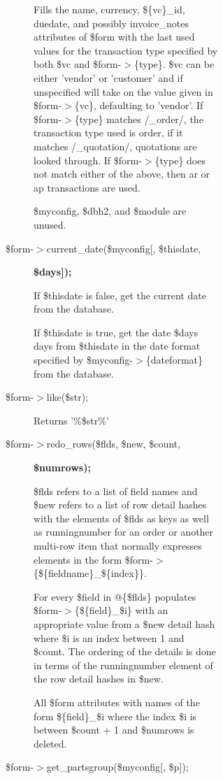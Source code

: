 \begin{description}
\begin{description}
\begin{description}
\begin{description}
\begin{description}
\begin{description}
Fills the name, currency, \$\{vc\}\_id, duedate, and possibly invoice\_notes
attributes of \$form with the last used values for the transaction type specified
by both \$vc and \$form-$>$\{type\}.  \$vc can be either 'vendor' or 'customer' and if
unspecified will take on the value given in \$form-$>$\{vc\}, defaulting to 'vendor'.
If \$form-$>$\{type\} matches /\_order/, the transaction type used is order, if it
matches /\_quotation/, quotations are looked through.  If \$form-$>$\{type\} does not
match either of the above, then ar or ap transactions are used.



\$myconfig, \$dbh2, and \$module are unused.


\item[{\$form-$>$current\_date(\$myconfig[, \$thisdate,}] \textbf{\$days]);}

If \$thisdate is false, get the current date from the database.



If \$thisdate is true, get the date \$days days from \$thisdate in the date
format specified by \$myconfig-$>$\{dateformat\} from the database.


\item[{\$form-$>$like(\$str);}] \mbox{}

Returns '\%\$str\%'


\item[{\$form-$>$redo\_rows(\$flds, \$new, \$count,}] \textbf{\$numrows);}

\$flds refers to a list of field names and \$new refers to a list of row detail
hashes with the elements of \$flds as keys as well as runningnumber for an order
or another multi-row item that normally expresses elements in the form
\$form-$>$\{\$\{fieldname\}\_\$\{index\}\}.



For every \$field in @\{\$flds\} populates \$form-$>$\{\$\{field\}\_\$i\} with an appropriate
value from a \$new detail hash where \$i is an index between 1 and \$count.  The
ordering of the details is done in terms of the runningnumber element of the
row detail hashes in \$new.



All \$form attributes with names of the form \$\{field\}\_\$i where the index \$i is
between \$count + 1 and \$numrows is deleted.


\item[{\$form-$>$get\_partsgroup(\$myconfig[, \$p]);}] \mbox{}


\end{description}
\end{description}
\end{description}
\end{description}
\end{description}
\end{description}
